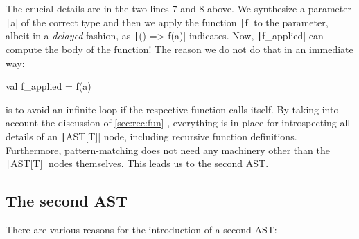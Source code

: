 \documentclass[11pt]{article}
\renewcommand{\vref}[1]{\autoref{#1} \vpageref{#1}}{}
\newcommand{\ScalaI}[1]{\texttt|#1|}
\begin{document}
\noindent The crucial details are in the two lines 7 and 8 above. We synthesize a parameter \ScalaI{a} of the correct type and then we apply the function \ScalaI{f} to the parameter, albeit in a \textit{delayed} fashion, as \ScalaI{() => f(a)} indicates. Now, \ScalaI{f_applied} can compute the body of the function! The reason we do not do that in an immediate way:

\begin{ScalaBlockSimple}
val f_applied = f(a)
\end{ScalaBlockSimple}

\noindent is to avoid an infinite loop if the respective function calls itself. By taking into account the discussion of \vref{sec:rec:fun}, everything is in place for introspecting all details of an \ScalaI{AST[T]} node, including recursive function definitions. Furthermore, pattern-matching does not need any machinery other than the \ScalaI{AST[T]} nodes themselves. This leads us to the second AST.

\subsection{The second AST}
There are various reasons for the introduction of a second AST:
\end{document}

